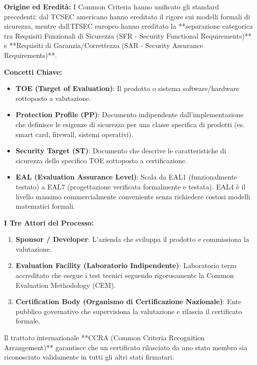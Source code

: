 \documentclass[11pt,a4paper]{article}
\begin{document}
\begin{solutionbox}
\textbf{Origine ed Eredit\`a:}
I Common Criteria hanno unificato gli standard precedenti: dal TCSEC americano hanno ereditato il rigore sui modelli formali di sicurezza, mentre dall'ITSEC europeo hanno ereditato la **separazione categorica tra Requisiti Funzionali di Sicurezza (SFR - Security Functional Requirements)** e **Requisiti di Garanzia/Correttezza (SAR - Security Assurance Requirements)**.

\textbf{Concetti Chiave:}
\begin{itemize}
    \item \textbf{TOE (Target of Evaluation)}: Il prodotto o sistema software/hardware sottoposto a valutazione.
    \item \textbf{Protection Profile (PP)}: Documento indipendente dall'implementazione che definisce le esigenze di sicurezza per una classe specifica di prodotti (es. smart card, firewall, sistemi operativi).
    \item \textbf{Security Target (ST)}: Documento che descrive le caratteristiche di sicurezza dello specifico TOE sottoposto a certificazione.
    \item \textbf{EAL (Evaluation Assurance Level)}: Scala da EAL1 (funzionalmente testato) a EAL7 (progettazione verificata formalmente e testata). EAL4 \`e il livello massimo commercialmente conveniente senza richiedere costosi modelli matematici formali.
\end{itemize}

\textbf{I Tre Attori del Processo:}
\begin{enumerate}
    \item \textbf{Sponsor / Developer}: L'azienda che sviluppa il prodotto e commissiona la valutazione.
    \item \textbf{Evaluation Facility (Laboratorio Indipendente)}: Laboratorio terzo accreditato che esegue i test tecnici seguendo rigorosamente la Common Evaluation Methodology (CEM).
    \item \textbf{Certification Body (Organismo di Certificazione Nazionale)}: Ente pubblico governativo che supervisiona la valutazione e rilascia il certificato formale.
\end{enumerate}
Il trattato internazionale **CCRA (Common Criteria Recognition Arrangement)** garantisce che un certificato rilasciato da uno stato membro sia riconosciuto validamente in tutti gli altri stati firmatari.
\end{solutionbox}
\end{document}
